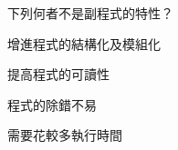 \ifx\ntpcNinetyThree\undefined[93學年基北區] \fi
下列何者不是副程式的特性？
  \begin{optionlist}
  \item 增進程式的結構化及模組化
  \item 提高程式的可讀性
  \item 程式的除錯不易\label{ntpc-93-a27}
  \item 需要花較多執行時間
  \end{optionlist}